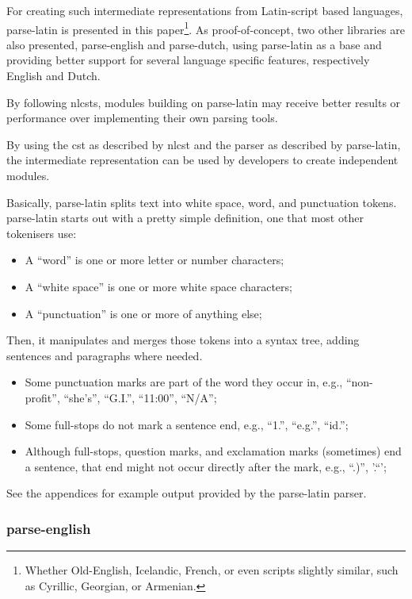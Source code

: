 For creating such intermediate representations from Latin-script based
languages, parse-latin is presented in this paper\footnote{Whether
  Old-English, Icelandic, French, or even scripts slightly similar, such
  as Cyrillic, Georgian, or Armenian.}. As proof-of-concept, two other
libraries are also presented, parse-english and parse-dutch, using
parse-latin as a base and providing better support for several language
specific features, respectively English and Dutch.

By following \glspl{nlcst}, modules building on parse-latin may receive
better results or performance over implementing their own parsing tools.

By using the \gls{cst} as described by \gls{nlcst} and the parser as
described by parse-latin, the intermediate representation can be used by
developers to create independent modules.

Basically, parse-latin splits text into white space, word, and
punctuation tokens. parse-latin starts out with a pretty simple
definition, one that most other tokenisers use:

\begin{itemize}
\itemsep1pt\parskip0pt
\item
  A ``word'' is one or more letter or number characters;
\item
  A ``white space'' is one or more white space characters;
\item
  A ``punctuation'' is one or more of anything else;
\end{itemize}

Then, it manipulates and merges those tokens into a syntax tree, adding
sentences and paragraphs where needed.

\begin{itemize}
\itemsep1pt\parskip0pt
\item
  Some punctuation marks are part of the word they occur in, e.g.,
  ``non-profit'', ``she's'', ``G.I.'', ``11:00'', ``N/A'';
\item
  Some full-stops do not mark a sentence end, e.g., ``1.'', ``e.g.'',
  ``id.'';
\item
  Although full-stops, question marks, and exclamation marks (sometimes)
  end a sentence, that end might not occur directly after the mark,
  e.g., ``.)'', '.``';
\end{itemize}

See the appendices for example output provided by the parse-latin
parser.

\subsubsection{parse-english}\label{parse-english}

